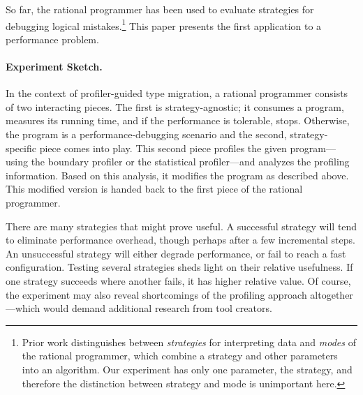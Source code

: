So far, the rational programmer has been used to evaluate
strategies for debugging logical mistakes.\footnote{Prior work
distinguishes between \emph{strategies} for interpreting data and
\emph{modes} of the rational programmer, which combine a strategy and other
parameters into an algorithm. Our experiment has only one parameter, the
strategy, and therefore the distinction between strategy and mode is
unimportant here.}
This paper presents the first application to a performance problem.

\paragraph{Experiment Sketch.}
In the context of profiler-guided
type migration, a rational programmer consists of two interacting pieces.  The
first is strategy-agnostic; it consumes a program, measures its running time,
and if the performance is tolerable, stops. Otherwise, the program is a
performance-debugging scenario and the second,
strategy-specific piece comes into play. This second piece profiles the given program---using
the boundary profiler or the statistical profiler---and analyzes the
profiling information. Based on this analysis, it modifies the program
as described above.
This modified version is handed back
to the first piece of the rational programmer.

There are many strategies that might prove useful.
A successful strategy will tend to eliminate performance overhead,
though perhaps after a few incremental steps.
An unsuccessful strategy will either degrade performance, or fail
to reach a fast configuration.
Testing several strategies sheds light on their relative usefulness.
If one strategy succeeds where another fails, it has higher relative value.
Of course, the experiment may also reveal shortcomings of the profiling approach
altogether---which would demand additional research from tool creators.

